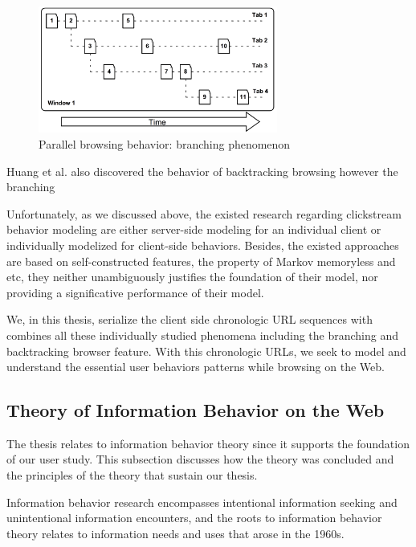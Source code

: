 \begin{figure}[H]
    \centering
    \includegraphics[width=0.7\textwidth]{figures/branching-and-backtracking}
    \caption{Parallel browsing behavior: branching phenomenon \cite{huang2010parallel}}
    \label{fig:backtrace}
\end{figure}

Huang et al. \cite{huang2012no} also discovered the behavior of backtracking browsing
however the branching

Unfortunately, as we discussed above, the existed research regarding clickstream 
behavior modeling are either server-side modeling for an individual client or 
individually modelized for client-side behaviors. Besides, the existed approaches are
based on self-constructed features, the property of Markov memoryless and etc, they 
neither unambiguously justifies the foundation of their model, 
nor providing a significative performance of their model.

We, in this thesis, serialize the client side chronologic URL sequences with combines all 
these individually studied phenomena including the branching and backtracking browser 
feature. With this chronologic URLs, we seek to model and understand the essential user 
behaviors patterns while browsing on the Web.

\subsection{Theory of Information Behavior on the Web}
\label{sec:info-seek}

The thesis relates to information behavior theory since it supports the foundation of our
user study. This subsection discusses how the theory was concluded and the principles of the theory that sustain our thesis.

Information behavior research encompasses intentional information seeking and 
unintentional information encounters, and the roots to information behavior 
theory relates to \cite{doi:10.1002/aris.2009.1440430114} information needs and uses that arose in the 1960s.

